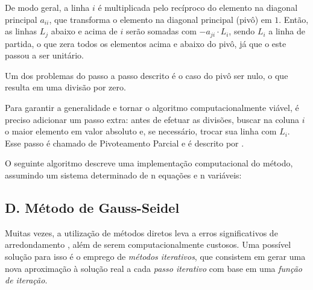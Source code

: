 \documentclass[twocolumn, 10pt]{extarticle}
\begin{document}
De modo geral, a linha $i$ é multiplicada pelo recíproco do elemento na diagonal principal $a_{ii}$, que transforma o elemento na diagonal principal (pivô) em $1$. Então, as linhas $L_j$ abaixo e acima de $i$ serão somadas com $-a_{ji}\cdot L_i$, sendo $L_i$ a linha de partida, o que zera todos os elementos acima e abaixo do pivô, já que o este passou a ser unitário.

Um dos problemas do passo a passo descrito é o caso do pivô ser nulo, o que resulta em uma divisão por zero. 

Para garantir a generalidade e tornar o algoritmo computacionalmente viável, é preciso adicionar um passo extra: antes de efetuar as divisões, buscar na coluna $i$ o maior elemento em valor absoluto e, se necessário, trocar sua linha com $L_i$. Esse passo é chamado de Pivoteamento Parcial e é descrito por \cite[p. 127]{ruggiero}.

O seguinte algoritmo descreve uma implementação computacional do método, assumindo um sistema determinado de n equações e n variáveis:

\begingroup
{}\label{gj}
\begin{algorithmic}[1]
  		\EndIf
	\EndFor
	\EndIf
\EndFunction
{}
		\EndFor
			\EndIf		
			\EndFor	
		\EndFor
	\EndFor
\EndFunction
\end{algorithmic}
\hrulefill
\endgroup

\subsection*{D. \quad Método de Gauss-Seidel}

Muitas vezes, a utilização de métodos diretos leva a erros significativos de arredondamento \cite[p. 173]{augusto}, além de serem computacionalmente custosos. Uma possível solução para isso é o emprego de \textit{métodos iterativos}, que consistem em gerar uma nova aproximação à solução real a cada \textit{passo iterativo} com base em uma \textit{função de iteração}.
\end{document}
